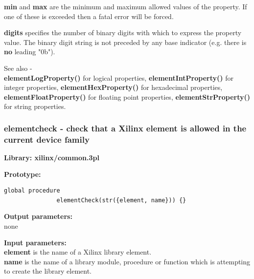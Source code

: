             {\bf min} and {\bf max} are the minimum and maximum allowed values
            of the property. If one of these is exceeded then a fatal error
            will be forced.
            
            {\bf digits} specifies the number of binary digits with which to
            express the property value. The binary digit string is not
            preceded by any base indicator (e.g. there is {\bf no} leading "0b").
            
            See also - \\
            {\bf elementLogProperty()}  for logical properties,
            {\bf elementIntProperty()}  for integer properties,
            {\bf elementHexProperty()}  for hexadecimal properties,
            {\bf elementFloatProperty()}  for floating point properties,
            {\bf elementStrProperty()}  for string properties.
        
        


        \subsubsection{elementcheck - check that a Xilinx element is allowed in the current device family}\label{sec:lpelementcheck}
            
            {\bf Library: xilinx/common.3pl}

            {\bf Prototype:} \\
            \vsp
            \begin{lstlisting}[gobble=12, language=threepl]
               global procedure
               elementCheck(str({element, name})) {}
            \end{lstlisting}

            {\bf Output parameters:} \\
            none

            {\bf Input parameters:} \\            
            {\bf element} is the name of a Xilinx library element. \\
            {\bf name} is the name of a library module, procedure or function which is
            attempting to create the library element.
        
